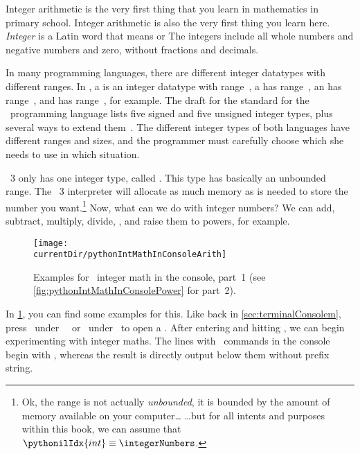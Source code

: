 %
\label{sec:int}%
%
Integer arithmetic is the very first thing that you learn in mathematics in primary school.
Integer arithmetic is also the very first thing you learn here.
\emph{Integer} is a Latin word that means  or 
The integers include all whole numbers and negative numbers and zero, without fractions and decimals.

In many programming languages, there are different integer datatypes with different ranges.
In , a  is an integer datatype with range~, a  has range~, an  has range~, and  has range~, for example.
The draft for the  standard for the ~programming language lists five signed and five unsigned integer types, plus several ways to extend them~\cite{ISOIEC98892017PLCWDOS}.
The different integer types of both languages have different ranges and sizes, and the programmer must carefully choose which she needs to use in which situation.

\python~3 only has one integer type, called .
This type has basically an unbounded range.
The \python~3 interpreter will allocate as much memory as is needed to store the number you want.\footnote{%
Ok, the range is not actually \emph{unbounded}, it is bounded by the amount of memory available on your computer{\dots} {\dots}but for all intents and purposes within this book, we can assume that~$\pythonilIdx{int}\equiv\integerNumbers$.}%
%
%
\label{sec:int:integerArithmetics}%
Now, what can we do with integer numbers?
We can add, subtract, multiply, divide, , and raise them to powers, for example.

\begin{figure}%
\centering%
\texttt{[image: \\currentDir/pythonIntMathInConsoleArith]}%
\caption{Examples for \python\ integer math in the console, part~1 (see \cref{fig:pythonIntMathInConsolePower} for part~2).}%
\label{fig:pythonIntMathInConsoleArith}%
\end{figure}%

In \cref{fig:pythonIntMathInConsoleArith}, you can find some examples for this.
Like back in \cref{sec:terminalConsolem}, press \ubuntuTerminal\ under \ubuntu\ \linux\ or \windowsTerminal\ under \microsoftWindows\ to open a .
After entering  and hitting \keys{\enter}, we can begin experimenting with integer maths.
The lines with \python\ commands in the console begin with \pythonil{>>>}, whereas the result is directly output below them without prefix string.

